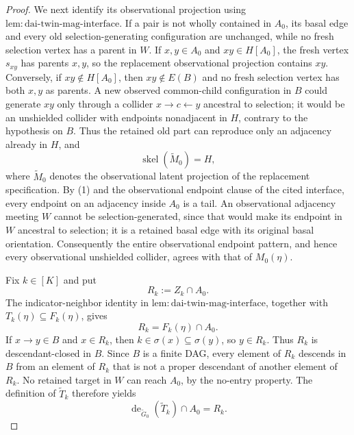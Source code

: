 \documentclass{article}
\begin{document}
\begin{proof}
We next identify its observational projection using \(\mathrm{lem:dai\mbox{-}twin\mbox{-}mag\mbox{-}interface}\).  If a pair is not wholly contained in \(A_0\), its basal edge and every old selection-generating configuration are unchanged, while no fresh selection vertex has a parent in \(W\).  If \(x,y\in A_0\) and \(xy\in H[A_0]\), the fresh vertex \(s_{xy}\) has parents \(x,y\), so the replacement observational projection contains \(xy\).  Conversely, if \(xy\notin H[A_0]\), then \(xy\notin E(B)\) and no fresh selection vertex has both \(x,y\) as parents.  A new observed common-child configuration in \(B\) could generate \(xy\) only through a collider \(x\to c\leftarrow y\) ancestral to selection; it would be an unshielded collider with endpoints nonadjacent in \(H\), contrary to the hypothesis on \(B\).  Thus the retained old part can reproduce only an adjacency already in \(H\), and
\[
 \operatorname{skel}(\widetilde M_0)=H,
 \tag{2}
\]
where \(\widetilde M_0\) denotes the observational latent projection of the replacement specification.  By (1) and the observational endpoint clause of the cited interface, every endpoint on an adjacency inside \(A_0\) is a tail.  An observational adjacency meeting \(W\) cannot be selection-generated, since that would make its endpoint in \(W\) ancestral to selection; it is a retained basal edge with its original basal orientation.  Consequently the entire observational endpoint pattern, and hence every observational unshielded collider, agrees with that of \(M_0(\eta)\).

Fix \(k\in[K]\) and put
\[
 R_k:=Z_k\cap A_0.
\]
The indicator-neighbor identity in \(\mathrm{lem:dai\mbox{-}twin\mbox{-}mag\mbox{-}interface}\), together with \(T_k(\eta)\subseteq F_k(\eta)\), gives
\[
 R_k=F_k(\eta)\cap A_0.
 \tag{3}
\]
If \(x\to y\in B\) and \(x\in R_k\), then \(k\in\sigma(x)\subseteq\sigma(y)\), so \(y\in R_k\).  Thus \(R_k\) is descendant-closed in \(B\).  Since \(B\) is a finite DAG, every element of \(R_k\) descends in \(B\) from an element of \(R_k\) that is not a proper descendant of another element of \(R_k\).  No retained target in \(W\) can reach \(A_0\), by the no-entry property.  The definition of \(\widetilde T_k\) therefore yields
\[
 \operatorname{de}_{\widetilde G_0}(\widetilde T_k)\cap A_0=R_k.
 \tag{4}
\]


\end{proof}
\end{document}
